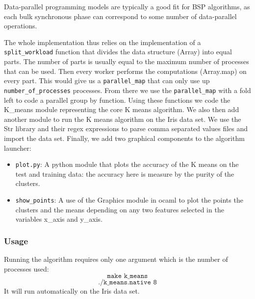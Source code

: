 \documentclass[10pt,a4paper]{article}
\begin{document}
Data-parallel programming models are typically a good fit for BSP algorithms, as each bulk synchronous phase can correspond to some number of data-parallel operations.


The whole implementation thus relies on the implementation of a \texttt{split\_workload} function that divides the data structure (Array) into equal parts. The number of parts is usually equal to the maximum number of processes that can be used.
Then every worker performs the computations (Array.map) on every part.
This would give us a \texttt{parallel\_map} that can only use up \texttt{number\_of\_processes} processes.
From there we use the \texttt{parallel\_map} with a fold left to code a parallel group by function.
Using these functions we code the K\_means module representing the core K means algorithm.
We also then add another module to run the K means algorithm on the Iris data set.
We use the Str library and their regex expressions to parse comma separated values files and import the data set.
Finally, we add two graphical components to the algorithm launcher:
\begin{itemize}
\item \texttt{plot.py}: A python module that plots the accuracy of the K means on the test and training data: the accuracy here is measure by the purity of the clusters.

\item \texttt{show\_points}: A use of the Graphics module in ocaml to plot the points the clusters and the means depending on any two features selected in the variables x\_axis and y\_axis.
\end{itemize}


\subsubsection{Usage}

Running the algorithm requires only one argument which is the number of processes used: $$\texttt{make k\_means}$$ $$\texttt{./k\_means.native 8}$$
It will run automatically on the Iris data set.
\end{document}
